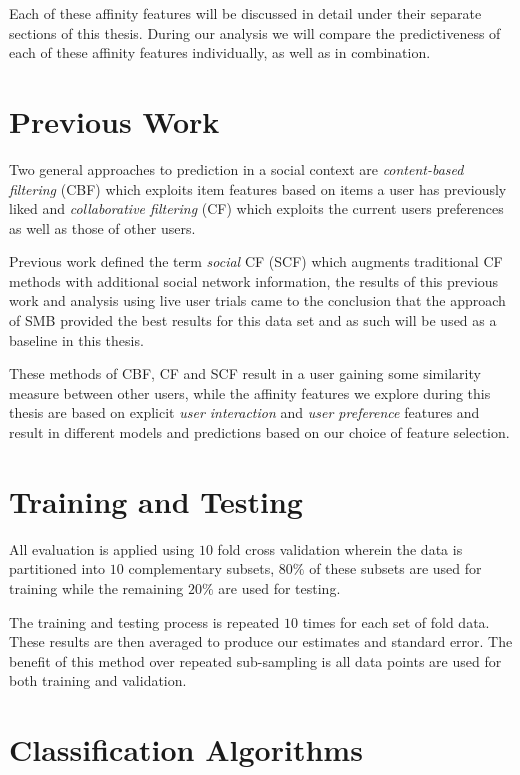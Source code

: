 Each of these affinity features will be discussed in detail under their separate sections of this thesis.
During our analysis we will compare the predictiveness of each of these affinity features individually, as well as in combination.

\section{Previous Work}
\label{sec:pw}

Two general approaches to prediction in a social context are \emph{content-based filtering} (CBF) \cite{newsweeder} which exploits 
item features based on items a user has previously liked and  \emph{collaborative filtering} (CF) 
\cite{collab_filtering} which exploits the current users preferences as well as those of other users. 

Previous work defined the term \emph{social} CF (SCF) \cite{joseph} which augments traditional CF methods with additional social 
network information, the results of this previous work and analysis using live user trials came to the conclusion that the approach of SMB
provided the best results for this data set and as such will be used as a baseline in this thesis.

These methods of CBF, CF and SCF result in a user gaining some similarity measure between other users, while the affinity features we 
explore during this thesis are based on explicit \emph{user interaction} and \emph{user preference} features and result in different 
models and predictions based on our choice of feature selection.

\section{Training and Testing}
\label{sec:tt}

All evaluation is applied using $10$ fold cross validation wherein the data is partitioned into $10$ complementary subsets, $80\%$ of 
these subsets are used for training while the remaining $20\%$ are used for testing.

The training and testing process is repeated $10$ times for each set of fold data. These results are then averaged to produce our 
estimates and standard error. The benefit of this method over repeated sub-sampling is all data points are used for both training 
and validation.

\section{Classification Algorithms}
\label{sec:meth}

